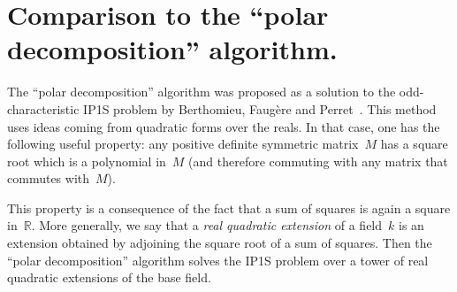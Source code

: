 \documentclass{amsart}
\let\fr\mathfrak
\def\mat#1{\begin{pmatrix}#1\end{pmatrix}}
\begin{document}
% 
% 
% 
% 
% 
% 
\section{Comparison to the ``polar decomposition'' algorithm.}
\label{ap:polar}

The “polar decomposition” algorithm was proposed as a solution to
the odd-characteristic IP1S problem by
Berthomieu, Faugère and Perret~\cite{2013bfp}.
This method uses ideas coming from quadratic forms over the reals.
In that case, one has the following useful property:
any positive definite symmetric matrix~$M$ has a square root
which is a polynomial in~$M$
(and therefore commuting with any matrix that commutes with~$M$).

This property is a consequence of the fact
that a sum of squares is again a square in~$ℝ$.
More generally, we say that a \emph{real quadratic extension} of a field~$k$
is an extension obtained by adjoining the square root of a sum of squares.
Then the “polar decomposition” algorithm solves the IP1S problem
over a tower of real quadratic extensions of the base field.
\end{document}
